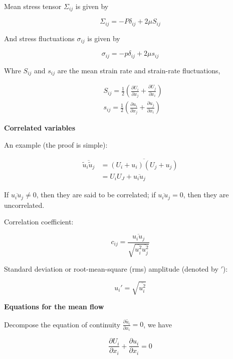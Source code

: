 \documentclass{article}
\begin{document}
Mean stress tensor $\Sigma_{ij}$ is given by

\begin{equation*}
    \Sigma_{ij}=-P\delta_{ij}+2\mu S_{ij}
\end{equation*}

And stress fluctuations $\sigma_{ij}$ is given by

\begin{equation*}
    \sigma_{ij}=-p\delta_{ij}+2\mu s_{ij}
\end{equation*}

Whre $S_{ij}$ and $s_{ij}$ are the mean strain rate and strain-rate fluctuations,

\begin{align*}
     & S_{ij}=\frac{1}{2}\left(\frac{\partial U_i}{\partial x_j}+\frac{\partial U_j}{\partial x_i}\right) \\
     & s_{ij}=\frac{1}{2}\left(\frac{\partial u_i}{\partial x_j}+\frac{\partial u_j}{\partial x_i}\right)
\end{align*}

\textbf{Correlated variables}

An example (the proof is simple):

\begin{align*}
    \overline{\tilde u_i \tilde u_j} & =\overline{(U_i+u_i)(U_j+u_j)} \\
                                & =U_iU_J+\overline{u_iu_j}
\end{align*}

If $\overline{u_iu_j}\neq0$, then they are said to be correlated; if $\overline{u_iu_j}=0$, then they are uncorrelated.

Correlation coefficient:

\begin{equation*}
    c_{ij}=\frac{\overline{u_iu_j}}{\sqrt{\overline{u_i^2}\overline{u_j^2}}}
\end{equation*}

Standard deviation or root-mean-square (rms) amplitude (denoted by $'$):

\begin{equation*}
    u_i'=\sqrt{\overline{u_i^2}}
\end{equation*}

\textbf{Equations for the mean flow}

Decompose the equation of continuity $\frac{\partial \tilde{u_i}}{\partial x_i}=0$, we have

\begin{equation*}
    \frac{\partial U_i}{\partial x_i}+\frac{\partial u_i}{\partial x_i}=0
\end{equation*}
\end{document}
